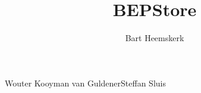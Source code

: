 \documentclass[oneside]{tudelft-report}
\begin{document}
\frontmatter

\title[Final report\\TI3806 - Bachelorproject]{BEPStore}
\author{Bart Heemskerk}{Wouter Kooyman van Guldener}{Steffan Sluis}
\makecover






\tableofcontents

\mainmatter








\appendix










\end{document}
